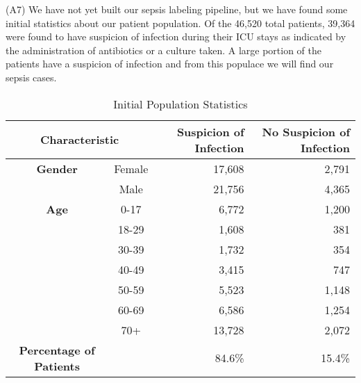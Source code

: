 \documentclass{amia}
\begin{document}
	(A7) We have not yet built our sepsis labeling pipeline,
	but we have found some initial statistics about our patient
	population. 
	 Of the 46,520 total patients, 39,364 were found
	to have suspicion of infection during their ICU stays as
	indicated by the administration of antibiotics or a culture
	taken. 
	 A large portion of the patients have a suspicion of
	infection and from this populace we will find our sepsis
	cases.

\hfill \break

\begin{table}[htb]
\centering
\caption{Initial Population Statistics}
\begin{tabular}{c c r r}
\hline
\multicolumn{2}{c}{Characteristic} &Suspicion of Infection & No Suspicion of Infection \\
\hline
\textbf{Gender} & Female &  17,608 & 2,791\\
             &  Male    &  21,756  & 4,365\\
\hline   
\textbf{Age}      & 0-17   &  6,772  & 1,200\\
             &  18-29   &  1,608  & 381\\
             &  30-39   &  1,732 & 354\\
             &  40-49   & 3,415  &  747\\
             &  50-59   &  5,523  & 1,148\\
             &  60-69   &  6,586  & 1,254\\
             &  70+       &  13,728  & 2,072\\
\hline
\textbf{Percentage of Patients} & & 84.6\% & 15.4\%
\end{tabular}
\end{table}
\end{document}

